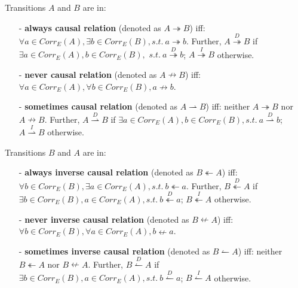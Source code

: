 \documentclass{llncs}
\begin{document}
\begin{definition}\label{def:causalRelations}
Transitions $A$ and $B$ are in: 
	\begin{itemize}
		\item[-] \textbf{always causal relation} (denoted as $A\twoheadrightarrow B$) iff: $\forall a\in Corr_{E}(A), \exists b\in Corr_{E}(B), s.t.~a\twoheadrightarrow b$. Further, $A\overset{D}{\twoheadrightarrow}B$ if $\exists a\in Corr_{E}(A), b\in Corr_{E}(B),$ $s.t.~a\overset{D}{\twoheadrightarrow}b$; $A\overset{I}{\twoheadrightarrow}B$ otherwise.
		\item[-] \textbf{never causal relation} (denoted as $A\nrightarrow B$) iff: $\forall a\in Corr_{E}(A), \forall b\in Corr_{E}(B), a\nrightarrow b$.
		\item[-] \textbf{sometimes causal relation} (denoted as $A\rightharpoonup B$) iff: neither $A\twoheadrightarrow B$ nor $A\nrightarrow B$. Further, $A\overset{D}{\rightharpoonup}B$ if $\exists a\in Corr_{E}(A), b\in Corr_{E}(B), s.t.~a\overset{D}{\rightharpoonup}b$; $A\overset{I}{\rightharpoonup}B$ otherwise.
	\end{itemize}  
\end{definition}

\begin{definition}\label{def:inverseCausalRelations}
Transitions $B$ and $A$ are in: 
	\begin{itemize}
		\item[-] \textbf{always inverse causal relation} (denoted as $B\twoheadleftarrow A$) iff: $\forall b\in Corr_{E}(B), \exists a\in Corr_{E}(A), s.t.~b\twoheadleftarrow a$. Further, $B\overset{D}{\twoheadleftarrow}A$ if $\exists b\in Corr_{E}(B), a\in Corr_{E}(A),s.t.~b\overset{D}{\twoheadleftarrow}a$; $B\overset{I}{\twoheadleftarrow}A$ otherwise.
		\item[-] \textbf{never inverse causal relation} (denoted as $B\nleftarrow A$) iff: $\forall b\in Corr_{E}(B), \forall a\in Corr_{E}(A), b\nleftarrow a$.
		\item[-] \textbf{sometimes inverse causal relation} (denoted as $B\leftharpoonup A$) iff: neither $B\twoheadleftarrow A$ nor $B\nleftarrow A$. Further, $B\overset{D}{\leftharpoonup}A$ if $\exists b\in Corr_{E}(B), a\in Corr_{E}(A), s.t.~b\overset{D}{\leftharpoonup}a$; $B\overset{I}{\leftharpoonup}A$ otherwise.
	\end{itemize}
\end{definition}
\end{document}
